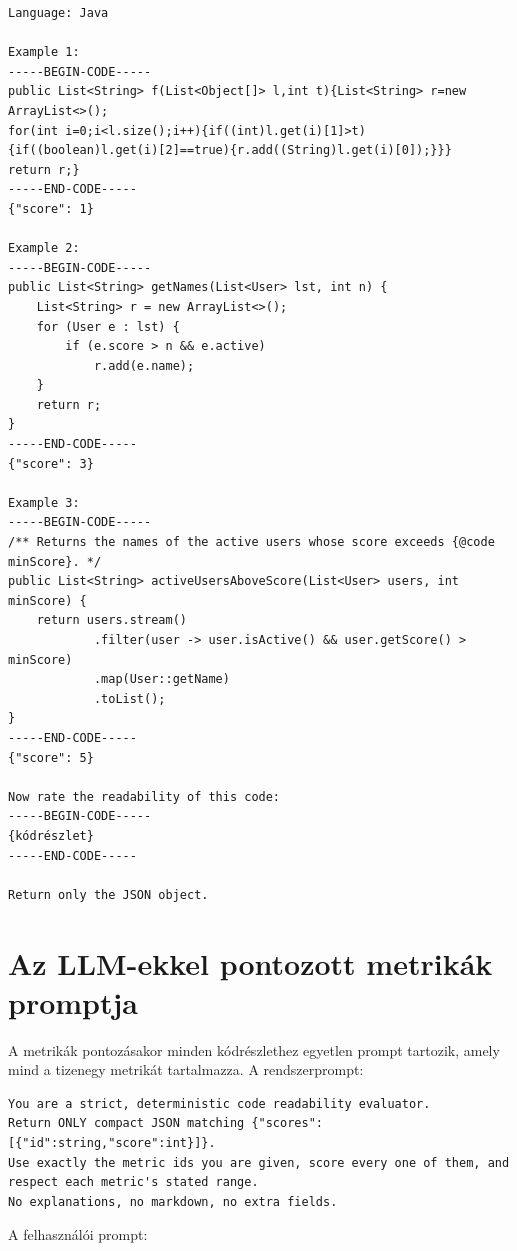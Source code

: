 \documentclass[
]{elteikthesis}[2024/04/26]
\begin{document}
\begin{lstlisting}[breaklines=true]
Language: Java

Example 1:
-----BEGIN-CODE-----
public List<String> f(List<Object[]> l,int t){List<String> r=new ArrayList<>();
for(int i=0;i<l.size();i++){if((int)l.get(i)[1]>t){if((boolean)l.get(i)[2]==true){r.add((String)l.get(i)[0]);}}}
return r;}
-----END-CODE-----
{"score": 1}

Example 2:
-----BEGIN-CODE-----
public List<String> getNames(List<User> lst, int n) {
    List<String> r = new ArrayList<>();
    for (User e : lst) {
        if (e.score > n && e.active)
            r.add(e.name);
    }
    return r;
}
-----END-CODE-----
{"score": 3}

Example 3:
-----BEGIN-CODE-----
/** Returns the names of the active users whose score exceeds {@code minScore}. */
public List<String> activeUsersAboveScore(List<User> users, int minScore) {
    return users.stream()
            .filter(user -> user.isActive() && user.getScore() > minScore)
            .map(User::getName)
            .toList();
}
-----END-CODE-----
{"score": 5}

Now rate the readability of this code:
-----BEGIN-CODE-----
{kódrészlet}
-----END-CODE-----

Return only the JSON object.
\end{lstlisting}

\section*{Az LLM-ekkel pontozott metrikák promptja}

A metrikák pontozásakor minden kódrészlethez egyetlen prompt tartozik, amely
mind a tizenegy metrikát tartalmazza. A rendszerprompt:

\begin{lstlisting}[breaklines=true]
You are a strict, deterministic code readability evaluator.
Return ONLY compact JSON matching {"scores":[{"id":string,"score":int}]}.
Use exactly the metric ids you are given, score every one of them, and respect each metric's stated range.
No explanations, no markdown, no extra fields.
\end{lstlisting}

A felhasználói prompt:
\end{document}
